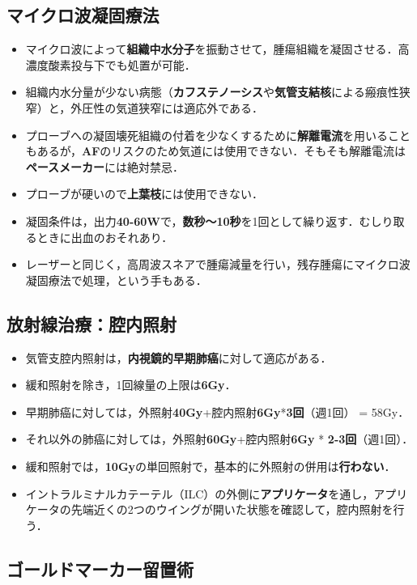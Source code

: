 \subsection{マイクロ波凝固療法}
\begin{itemize}

\item マイクロ波によって\textbf{組織中水分子}を振動させて，腫瘍組織を凝固させる．高濃度酸素投与下でも処置が可能．
\item 組織内水分量が少ない病態（\textbf{カフステノーシス}や\textbf{気管支結核}による瘢痕性狭窄）と，外圧性の気道狭窄には適応外である．
\item プローブへの凝固壊死組織の付着を少なくするために\textbf{解離電流}を用いることもあるが，\textbf{AF}のリスクのため気道には使用できない．そもそも解離電流は\textbf{ペースメーカー}には絶対禁忌．
\item プローブが硬いので\textbf{上葉枝}には使用できない．
\item 凝固条件は，出力\textbf{40-60W}で，\textbf{数秒〜10秒}を1回として繰り返す．むしり取るときに出血のおそれあり．
\item レーザーと同じく，高周波スネアで腫瘍減量を行い，残存腫瘍にマイクロ波凝固療法で処理，という手もある．

\end{itemize}

\subsection{放射線治療：腔内照射}

\begin{itemize}
\item 気管支腔内照射は，\textbf{内視鏡的早期肺癌}に対して適応がある．
\item 緩和照射を除き，1回線量の上限は\textbf{6Gy}．
\item 早期肺癌に対しては，外照射\textbf{40Gy}+腔内照射\textbf{6Gy}*\textbf{3回}（週1回） = 58Gy．
\item それ以外の肺癌に対しては，外照射\textbf{60Gy}+腔内照射\textbf{6Gy} * \textbf{2-3回}（週1回）．
\item 緩和照射では，\textbf{10Gy}の単回照射で，基本的に外照射の併用は\textbf{行わない}．
\item イントラルミナルカテーテル（ILC）の外側に\textbf{アプリケータ}を通し，アプリケータの先端近くの2つのウイングが開いた状態を確認して，腔内照射を行う．
\end{itemize}

\subsection{ゴールドマーカー留置術}


